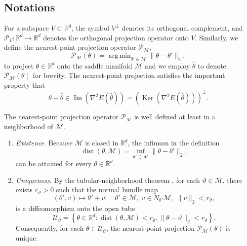 \documentclass[final]{siamart251216}
\DeclareMathOperator*{\argmin}{arg\,min}
\begin{document}
\subsection{Notations}
For a subspace $V\subset\mathbb{R}^{d}$, the symbol $V^\perp$ denotes its orthogonal complement, and $\mathcal{P}_V: \mathbb{R}^{d}\to \mathbb{R}^{d}$ denotes the orthogonal projection operator onto $V$.
Similarly, we define the nearest-point projection operator $\mathcal{P}_{\mathcal{M}}$,
\begin{equation}\label{eqn:projectionm}
\mathcal{P}_\mathcal{M}(\theta) =
\argmin_{\theta'\in\mathcal M} 
\|\theta-\theta'\|_2,
\end{equation}
to project $\theta \in \mathbb{R}^{d}$ onto the saddle manifold $\mathcal{M}$ and we employ $\hat{\theta}$ to denote $\mathcal{P}_\mathcal{M}(\theta)$ for brevity.
The nearest-point projection satisfies the important property that
\begin{equation}\label{eqn:proj}
\theta-\hat{\theta} \in 
\operatorname{Im}( \nabla^2 E(\hat{\theta}))
=\left(\operatorname{Ker}( \nabla^2 E(\hat{\theta}))\right)^\perp. 
\end{equation}

\begin{remark}
The nearest-point projection operator $\mathcal{P}_\mathcal{M}$ is well defined at least in a neighborhood of $\mathcal{M}$.
\begin{enumerate}
\item \emph{Existence.}
Because $\mathcal M$ is closed in $\mathbb R^d$, the infimum in the definition
\begin{equation}\label{eqn:distance}
\operatorname{dist}(\theta,\mathcal M) =
\inf_{\theta'\in\mathcal M} 
\|\theta-\theta'\|_2,
\end{equation}
can be attained for every $\theta \in \mathbb R^d$.
\item \emph{Uniqueness.}
By the tubular‐neighborhood theorem \cite{hirsch2012differential}, 
for each ${\vartheta}\in\mathcal M$, there exists $r_{{\vartheta}}>0$ such that the normal bundle map
\[
  (\theta',{v})\mapsto \theta'+{v},\quad
  \theta'\in\mathcal M,\;{v}\in N_{\theta'}\mathcal M,\;\|{v}\|_2
  < r_{{\vartheta}},
\]
is a diffeomorphism onto the open tube
\[
  \mathcal{U}_{{\vartheta}}=
  \left\{\theta\in\mathbb R^d:\operatorname{dist}(\theta,\mathcal M)<r_{{\vartheta}}, \|\theta-{\vartheta}\|_2 <r_{{\vartheta}}\right\}.
\]
Consequently, for each $\theta\in \mathcal{U}_{{\vartheta}}$, the nearest‐point projection  $\mathcal P_{\mathcal M}(\theta)$ is unique.
\end{enumerate}
\end{remark}
\end{document}
